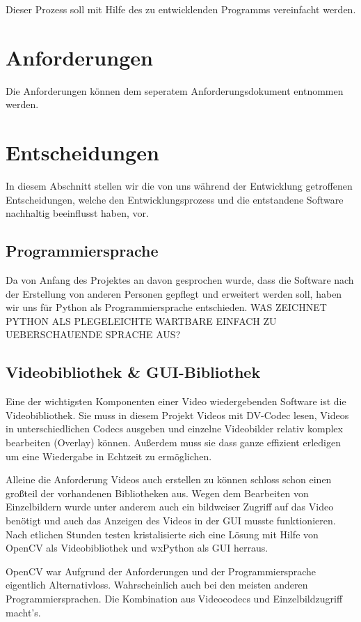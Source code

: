 \documentclass[a4paper,draft]{scrartcl}
\begin{document}
Dieser Prozess soll mit Hilfe des zu entwicklenden Programms vereinfacht werden.

\section{Anforderungen}
Die Anforderungen k\"onnen dem seperatem Anforderungsdokument entnommen werden.

\section{Entscheidungen}
In diesem Abschnitt stellen wir die von uns w\"ahrend der Entwicklung getroffenen Entscheidungen, welche den Entwicklungsprozess und die entstandene Software nachhaltig beeinflusst haben, vor.

\subsection{Programmiersprache}
Da von Anfang des Projektes an davon gesprochen wurde, dass die Software nach der Erstellung von anderen Personen gepflegt und erweitert werden soll, haben wir uns f\"ur Python als Programmiersprache entschieden.
WAS ZEICHNET PYTHON ALS PLEGELEICHTE WARTBARE EINFACH ZU UEBERSCHAUENDE SPRACHE AUS?

\subsection{Videobibliothek \& GUI-Bibliothek}
Eine der wichtigsten Komponenten einer Video wiedergebenden Software ist die Videobibliothek.
Sie muss in diesem Projekt Videos mit DV-Codec lesen, Videos in unterschiedlichen Codecs ausgeben und einzelne Videobilder relativ komplex bearbeiten (Overlay) k\"onnen.
Au\ss erdem muss sie dass ganze effizient erledigen um eine Wiedergabe in Echtzeit zu erm\"oglichen.

Alleine die Anforderung Videos auch erstellen zu k\"onnen schloss schon einen gro\ss teil der vorhandenen Bibliotheken aus.
Wegen dem Bearbeiten von Einzelbildern wurde unter anderem auch ein bildweiser Zugriff auf das Video ben\"otigt und auch das Anzeigen des Videos in der GUI musste funktionieren.
Nach etlichen Stunden testen kristalisierte sich eine L\"osung mit Hilfe von OpenCV als Videobibliothek und wxPython als GUI herraus.

OpenCV war Aufgrund der Anforderungen und der Programmiersprache eigentlich Alternativloss.
Wahrscheinlich auch bei den meisten anderen Programmiersprachen.
Die Kombination aus Videocodecs und Einzelbildzugriff macht's.
\end{document}
